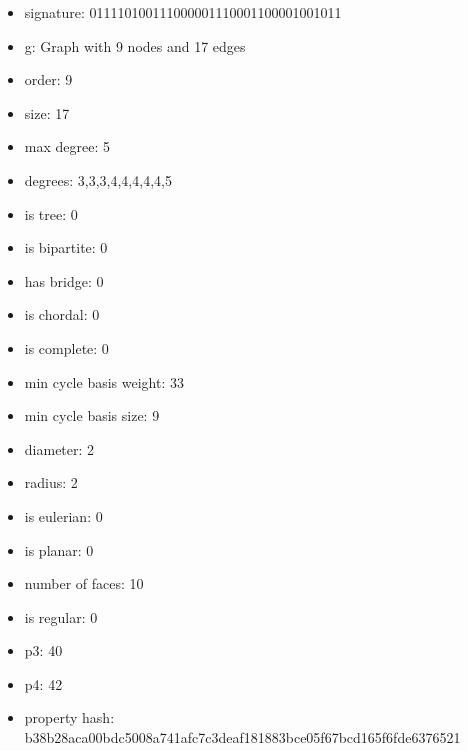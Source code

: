 \newpage
\begin{figure}
\end{figure}
\begin{itemize}
\item signature: 011110100111000001110001100001001011
\item g: Graph with 9 nodes and 17 edges
\item order: 9
\item size: 17
\item max degree: 5
\item degrees: 3,3,3,4,4,4,4,4,5
\item is tree: 0
\item is bipartite: 0
\item has bridge: 0
\item is chordal: 0
\item is complete: 0
\item min cycle basis weight: 33
\item min cycle basis size: 9
\item diameter: 2
\item radius: 2
\item is eulerian: 0
\item is planar: 0
\item number of faces: 10
\item is regular: 0
\item p3: 40
\item p4: 42
\item property hash: b38b28aca00bdc5008a741afc7c3deaf181883bce05f67bcd165f6fde6376521
\end{itemize}
